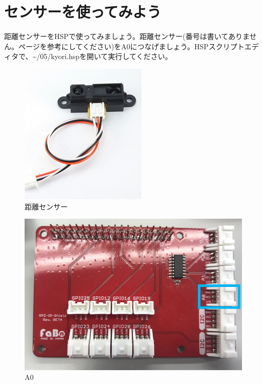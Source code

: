 \newpage
\section{センサーを使ってみよう}
距離センサーをHSPで使ってみましょう。距離センサー(番号は書いてありません。\pageref{distance}ページを参考にしてください)をA0につなげましょう。HSPスクリプトエディタで、\textasciitilde /05/kyori.hspを開いて実行してください。
\begin{center}
  \begin{minipage}[t]{.3\columnwidth}
    \begin{figure}[H]
      \centering
      \includegraphics[width=.8\linewidth]{images/chap05/text05-img031.png}
      \caption{距離センサー}
    \end{figure}
  \end{minipage}
  \begin{minipage}[t]{.5\columnwidth}
    \begin{figure}[H]
    \centering
    \includegraphics[width=.8\linewidth]{images/chap05/text05-img030.png}
    \caption{A0}
    \end{figure}
  \end{minipage}
\end{center}
